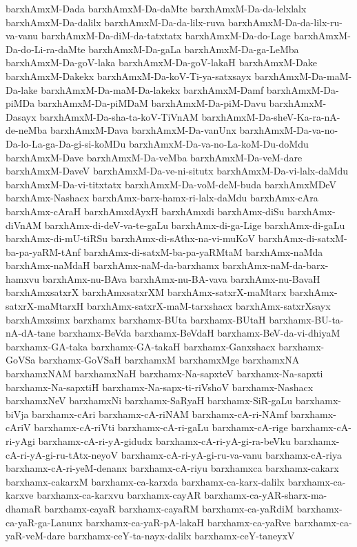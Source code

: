 {barxhAmxM-Dada
barxhAmxM-Da-daMte
barxhAmxM-Da-da-lelxlalx
barxhAmxM-Da-dalilx
barxhAmxM-Da-da-lilx-ruva
barxhAmxM-Da-da-lilx-ru-va-vanu
barxhAmxM-Da-diM-da-tatxtatx
barxhAmxM-Da-do-Lage
barxhAmxM-Da-do-Li-ra-daMte
barxhAmxM-Da-gaLa
barxhAmxM-Da-ga-LeMba
barxhAmxM-Da-goV-laka
barxhAmxM-Da-goV-lakaH
barxhAmxM-Dake
barxhAmxM-Dakekx
barxhAmxM-Da-koV-Ti-ya-satxsayx
barxhAmxM-Da-maM-Da-lake
barxhAmxM-Da-maM-Da-lakekx
barxhAmxM-Damf
barxhAmxM-Da-piMDa
barxhAmxM-Da-piMDaM
barxhAmxM-Da-piM-Davu
barxhAmxM-Dasayx
barxhAmxM-Da-sha-ta-koV-TiVnAM
barxhAmxM-Da-sheV-Ka-ra-nA-de-neMba
barxhAmxM-Dava
barxhAmxM-Da-vanUnx
barxhAmxM-Da-va-no-Da-lo-La-ga-Da-gi-si-koMDu
barxhAmxM-Da-va-no-La-koM-Du-doMdu
barxhAmxM-Dave
barxhAmxM-Da-veMba
barxhAmxM-Da-veM-dare
barxhAmxM-DaveV
barxhAmxM-Da-ve-ni-situtx
barxhAmxM-Da-vi-lalx-daMdu
barxhAmxM-Da-vi-titxtatx
barxhAmxM-Da-voM-deM-buda
barxhAmxMDeV
barxhAmx-Nashacx
barxhAmx-barx-hamx-ri-lalx-daMdu
barxhAmx-cAra
barxhAmx-cAraH
barxhAmxdAyxH
barxhAmxdi
barxhAmx-diSu
barxhAmx-diVnAM
barxhAmx-di-deV-va-te-gaLu
barxhAmx-di-ga-Lige
barxhAmx-di-gaLu
barxhAmx-di-mU-tiRSu
barxhAmx-di-sAthx-na-vi-muKoV
barxhAmx-di-satxM-ba-pa-yaRM-tAnf
barxhAmx-di-satxM-ba-pa-yaRMtaM
barxhAmx-naMda
barxhAmx-naMdaH
barxhAmx-naM-da-barxhamx
barxhAmx-naM-da-barx-hamxvu
barxhAmx-nu-BAva
barxhAmx-nu-BA-vava
barxhAmx-nu-BavaH
barxhAmxsatxrX
barxhAmxsatxrXM
barxhAmx-satxrX-maMtarx
barxhAmx-satxrX-maMtarxH
barxhAmx-satxrX-maM-tarxshacx
barxhAmx-satxrXsayx
barxhAmxsimx
barxhamx
barxhamx-BUta
barxhamx-BUtaH
barxhamx-BU-ta-nA-dA-tane
barxhamx-BeVda
barxhamx-BeVdaH
barxhamx-BeV-da-vi-dhiyaM
barxhamx-GA-taka
barxhamx-GA-takaH
barxhamx-Ganxshacx
barxhamx-GoVSa
barxhamx-GoVSaH
barxhamxM
barxhamxMge
barxhamxNA
barxhamxNAM
barxhamxNaH
barxhamx-Na-sapxteV
barxhamx-Na-sapxti
barxhamx-Na-sapxtiH
barxhamx-Na-sapx-ti-riVshoV
barxhamx-Nashacx
barxhamxNeV
barxhamxNi
barxhamx-SaRyaH
barxhamx-SiR-gaLu
barxhamx-biVja
barxhamx-cAri
barxhamx-cA-riNAM
barxhamx-cA-ri-NAmf
barxhamx-cAriV
barxhamx-cA-riVti
barxhamx-cA-ri-gaLu
barxhamx-cA-rige
barxhamx-cA-ri-yAgi
barxhamx-cA-ri-yA-gidudx
barxhamx-cA-ri-yA-gi-ra-beVku
barxhamx-cA-ri-yA-gi-ru-tAtx-neyoV
barxhamx-cA-ri-yA-gi-ru-va-vanu
barxhamx-cA-riya
barxhamx-cA-ri-yeM-denanx
barxhamx-cA-riyu
barxhamxca
barxhamx-cakarx
barxhamx-cakarxM
barxhamx-ca-karxda
barxhamx-ca-karx-dalilx
barxhamx-ca-karxve
barxhamx-ca-karxvu
barxhamx-cayAR
barxhamx-ca-yAR-sharx-ma-dhamaR
barxhamx-cayaR
barxhamx-cayaRM
barxhamx-ca-yaRdiM
barxhamx-ca-yaR-ga-Lanunx
barxhamx-ca-yaR-pA-lakaH
barxhamx-ca-yaRve
barxhamx-ca-yaR-veM-dare
barxhamx-ceY-ta-nayx-dalilx
barxhamx-ceY-taneyxV
}
